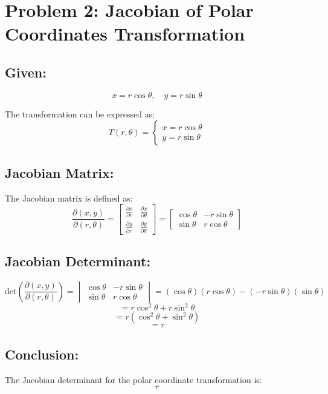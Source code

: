 \documentclass[11pt]{article}
\begin{document}
\section*{Problem 2: Jacobian of Polar Coordinates Transformation}

\subsection*{Given:}
\[
x = r \cos \theta, \quad y = r \sin \theta
\]

The transformation can be expressed as:
\[
T(r, \theta) =
\begin{cases}
x = r \cos \theta \\
y = r \sin \theta
\end{cases}
\]

\subsection*{Jacobian Matrix:}
The Jacobian matrix is defined as:
\[
\frac{\partial(x, y)}{\partial(r, \theta)} =
\begin{bmatrix}
\frac{\partial x}{\partial r} & \frac{\partial x}{\partial \theta} \\
\frac{\partial y}{\partial r} & \frac{\partial y}{\partial \theta}
\end{bmatrix}
=
\begin{bmatrix}
\cos \theta & -r \sin \theta \\
\sin \theta & r \cos \theta
\end{bmatrix}
\]

\subsection*{Jacobian Determinant:}
\[
\text{det}\left( \frac{\partial(x, y)}{\partial(r, \theta)} \right) =
\begin{vmatrix}
\cos \theta & -r \sin \theta \\
\sin \theta & r \cos \theta
\end{vmatrix}
= (\cos \theta)(r \cos \theta) - (-r \sin \theta)(\sin \theta)
\]
\[
= r \cos^2 \theta + r \sin^2 \theta
\]
\[
= r(\cos^2 \theta + \sin^2 \theta)
\]
\[
= r
\]

\subsection*{Conclusion:}
The Jacobian determinant for the polar coordinate transformation is:
\[
\boxed{r}
\]
\end{document}
